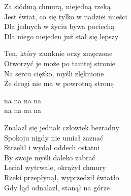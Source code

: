 \begin{text}
    Za siódmą chmurą, niejedną rzeką\\
    Jest świat, co się tylko w nadziei mieści\\
    Dla jednych w życiu bywa pociechą\\
    Dla niego niejeden już stał się lepszy

    Ten, który zamknie oczy zmęczone\\
    Otworzyć je może po tamtej stronie\\
    Na sercu ciężko, myśli zlęknione\\
    Że drogi nie ma w powrotną stronę

    \vin na na na na\\
    \vin na na na na

    Znalazł się jednak człowiek bezradny\\
    Spokoju nigdy nie umiał zaznać\\
    Strzelił i wydał oddech ostatni\\
    By swoje myśli daleko zabrać\\
    Leciał wytrwale, okrążył chmury\\
    Rzeki przepłynął, wyprzedził światło\\
    Gdy ląd odnalazł, stanął na górze
\end{text}
\begin{chord}

\end{chord}